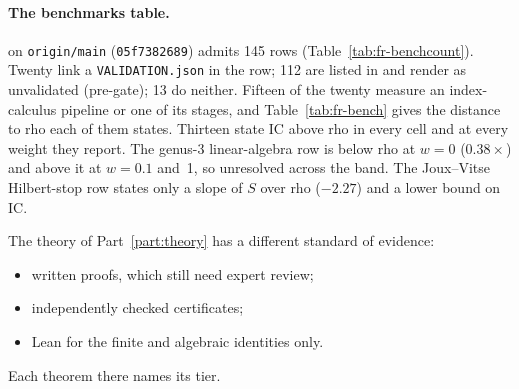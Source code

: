\paragraph{The benchmarks table.}  on
\texttt{origin/main} (\texttt{05f7382689}) admits 145 rows
(Table~\ref{tab:fr-benchcount}). Twenty link a \texttt{VALIDATION.json} in
the row; 112 are listed in  and render as
unvalidated (pre-gate); 13 do neither. Fifteen of the twenty measure an
index-calculus pipeline or one of its stages, and Table~\ref{tab:fr-bench}
gives the distance to rho each of them states. Thirteen state IC above rho in
every cell and at every weight they report. The genus-3 linear-algebra row is below rho at
$w=0$ ($0.38\times$) and above it at $w=0.1$ and~1, so unresolved across
the band. The Joux--Vitse Hilbert-stop row states only a slope of $S$ over
rho ($-2.27$) and a lower bound on IC.

\begin{table}[t]
\centering\small

\caption[]{Rows of the admitted benchmarks table by date and gate
standing. ``Linked'': the row links its \texttt{VALIDATION.json};
pre-gate: the row's slug is in ; neither:
admitted under the 24 October gate audit without a file linked in the row.
Counted by . Data:
.}
\label{tab:fr-benchcount}
\end{table}

\begin{table}[t]
\centering\scriptsize

\caption[]{The 15 admitted benchmark rows with a linked
\texttt{VALIDATION.json} that measure an index-calculus pipeline or stage,
with the distance to rho as each row's headline states it (excerpts; every
number checked against the row by ). The other
five linked rows are a strong-rho engineering round and four studies of
generic walks and pencil models priced against rho. Several rows state
their validation ``with caveats'' (same-host replay, one session). Source: . Data:
.}
\label{tab:fr-bench}
\end{table}

The theory of Part~\ref{part:theory} has a different standard of evidence:
\begin{itemize}
\item written proofs, which still need expert review;
\item independently checked certificates;
\item Lean for the finite and algebraic identities only.
\end{itemize}
Each theorem there names its tier.
